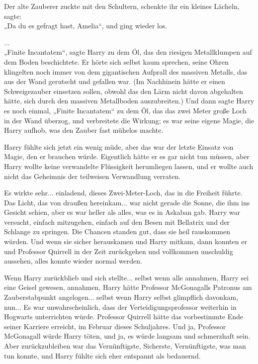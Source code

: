 {Der alte Zauberer zuckte mit den Schultern, schenkte ihr ein kleines Lächeln, sagte:\\ „Da du es gefragt hast, Amelia“, und ging wieder los.

...\\ „Finite Incantatem“, sagte Harry zu dem Öl, das den riesigen Metallklumpen auf dem Boden beschichtete. Er hörte sich selbst kaum sprechen, seine Ohren klingelten noch immer von dem gigantischen Aufprall des massiven Metalls, das aus der Wand gerutscht und gefallen war. (Im Nachhinein hätte er einen Schweigezauber einsetzen sollen, obwohl das den Lärm nicht davon abgehalten hätte, sich durch den massiven Metallboden auszubreiten.) Und dann sagte Harry es noch einmal, „Finite Incantatem“ zu dem Öl, das das zwei Meter große Loch in der Wand überzog, und verbreitete die Wirkung; es war seine eigene Magie, die Harry aufhob, was den Zauber fast mühelos machte.

Harry fühlte sich jetzt ein wenig müde, aber das war der letzte Einsatz von Magie, den er brauchen würde. Eigentlich hätte er es gar nicht tun müssen, aber Harry wollte keine verwandelte Flüssigkeit herumliegen lassen, und er wollte auch nicht das Geheimnis der teilweisen Verwandlung verraten.

Es wirkte sehr... einladend, dieses Zwei-Meter-Loch, das in die Freiheit führte. Das Licht, das von draußen hereinkam... war nicht gerade die Sonne, die ihm ins Gesicht schien, aber es war heller als alles, was es in Askaban gab. Harry war versucht, einfach mitzugehen, einfach auf den Besen mit Bellatrix und der Schlange zu springen. Die Chancen standen gut, dass sie heil rauskommen würden. Und wenn sie sicher herauskamen und Harry mitkam, dann konnten er und Professor Quirrell in der Zeit zurückgehen und vollkommen unschuldig aussehen, alles konnte wieder normal werden.

Wenn Harry zurückblieb und sich stellte... selbst wenn alle annahmen, Harry sei eine Geisel gewesen, annahmen, Harry hätte Professor McGonagalls Patronus am Zauberstabpunkt angelogen... selbst wenn Harry selbst glimpflich davonkam, nun... Es war unwahrscheinlich, dass der Verteidigungsprofessor weiterhin in Hogwarts unterrichten würde. Professor Quirrell hätte das vorbestimmte Ende seiner Karriere erreicht, im Februar dieses Schuljahres. Und ja, Professor McGonagall würde Harry töten, und ja, es würde langsam und schmerzhaft sein. Aber zurückzubleiben war das Vernünftigste, Sicherste, Vernünftigste, was man tun konnte, und Harry fühlte sich eher entspannt als bedauernd.

}

